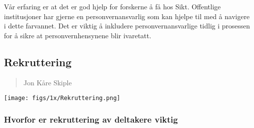 \documentclass[
  12pt,
  a4paper, 12pt]{article}
\begin{document}
Vår erfaring er at det er god hjelp for forskerne å få hos Sikt. Offentlige institusjoner har gjerne en personvernansvarlig som kan hjelpe til med å navigere i dette farvannet. Det er viktig å inkludere personvernansvarlige tidlig i prosessen for å sikre at personvernhensynene blir ivaretatt.

\newpage

\hypertarget{rekruttering}{%
\subsection{Rekruttering}\label{rekruttering}}

\begin{quote}
Jon Kåre Skiple
\end{quote}

\texttt{[image: figs/1x/Rekruttering.png]}

\hypertarget{hvorfor-er-rekruttering-av-deltakere-viktig}{%
\subsubsection{Hvorfor er rekruttering av deltakere viktig}\label{hvorfor-er-rekruttering-av-deltakere-viktig}}
\end{document}
